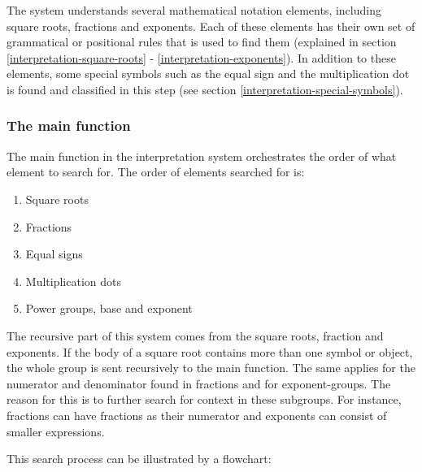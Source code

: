 

The system understands several mathematical notation elements, including square roots, fractions and exponents. Each of these elements has their own set of grammatical or positional rules that is used to find them (explained in section \ref{interpretation-square-roots} - \ref{interpretation-exponents}). In addition to these elements, some special symbols such as the equal sign and the multiplication dot is found and classified in this step (see section \ref{interpretation-special-symbols}).

\subsubsection{The main function}
The main function in the interpretation system orchestrates the order of what element to search for. The order of elements searched for is:

\begin{enumerate}
    \setlength\itemsep{0.3em}
    \item Square roots
    \item Fractions
    \item Equal signs
    \item Multiplication dots
    \item Power groups, base and exponent
\end{enumerate}

The recursive part of this system comes from the square roots, fraction and exponents. If the body of a square root contains more than one symbol or object, the whole group is sent recursively to the main function. The same applies for the numerator and denominator found in fractions and for exponent-groups. The reason for this is to further search for context in these subgroups. For instance, fractions can have fractions as their numerator and exponents can consist of smaller expressions. 

This search process can be illustrated by a flowchart:

